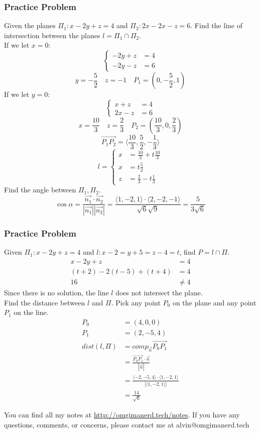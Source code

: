 \documentclass[letterpaper, 12pt]{math}
\begin{document}
\subsubsection*{Practice Problem}
Given the planes \( \Pi_1: x-2y+z = 4 \) and \( \Pi_2: 2x-2x-z = 6 \). Find the
line of intersection between the planes \( l = \Pi_1\cap\Pi_2 \). \\
If we let \( x = 0 \):
\[ \begin{cases}
  -2y+z &= 4 \\
  -2y-z &= 6
\end{cases} \]
\[ y = -\frac{5}{2} \quad z = -1 \quad P_1 = (0,-\frac{5}{2},1) \]
If we let \( y = 0 \):
\[ \begin{cases}
  x+z &= 4 \\
  2x-z &= 6
\end{cases} \]
\[ x = \frac{10}{3} \quad z = \frac{2}{3} \quad P_2 =
  (\frac{10}{3},0,\frac{2}{3}) \]
\[ \overrightarrow{P_1P_2} =
  \langle\frac{10}{3},\frac{5}{2},-\frac{1}{3}\rangle \]
\[ l = \begin{cases}
  x &= \frac{10}{3}+t\frac{10}{3} \\
  x &= t\frac{5}{2} \\
  z &= \frac{2}{3}-t\frac{1}{3}
\end{cases} \]
Find the angle between \( \Pi_1,\Pi_2 \).
\[ \cos\alpha = \frac{\vec{n_1}\cdot\vec{n_2}}{|\vec{n_1}||\vec{n_2}|} =
  \frac{\langle1,-2,1\rangle\cdot\langle2,-2,-1\rangle}{\sqrt{6}\sqrt{9}} =
  \frac{5}{3\sqrt{6}} \]

\subsubsection*{Practice Problem}
Given \( \Pi_1: x-2y+z = 4 \) and \( l: x-2 = y+5 = z-4 = t \), find
\( P = l\cap\Pi \).
\begin{align*}
  x-2y+z &= 4 \\
  (t+2)-2(t-5)+(t+4) &= 4 \\
  16 &\ne 4
\end{align*}
Since there is no solution, the line \( l \) does not intersect the plane. \\
Find the distance between \( l \) and \( \Pi \). Pick any point \( P_0 \) on
the plane and any point \( P_1 \) on the line.
\begin{align*}
  P_0 &= (4,0,0) \\
  P_1 &= (2,-5,4) \\
  dist(l,\Pi) &= comp_{\vec{n}}{\overrightarrow{P_0P_1}} \\
  &= \frac{\overrightarrow{P_0P_1}\cdot\vec{n}}{|\vec{n}|} \\
  &= \frac{\langle-2,-5,4\rangle\cdot\langle1,-2,1\rangle}
    {|\langle1,-2,1\rangle|} \\
  &= \frac{14}{\sqrt{6}}
\end{align*}

\begin{center}
  You can find all my notes at \url{http://omgimanerd.tech/notes}. If you have
  any questions, comments, or concerns, please contact me at
  alvin@omgimanerd.tech
\end{center}
\end{document}
